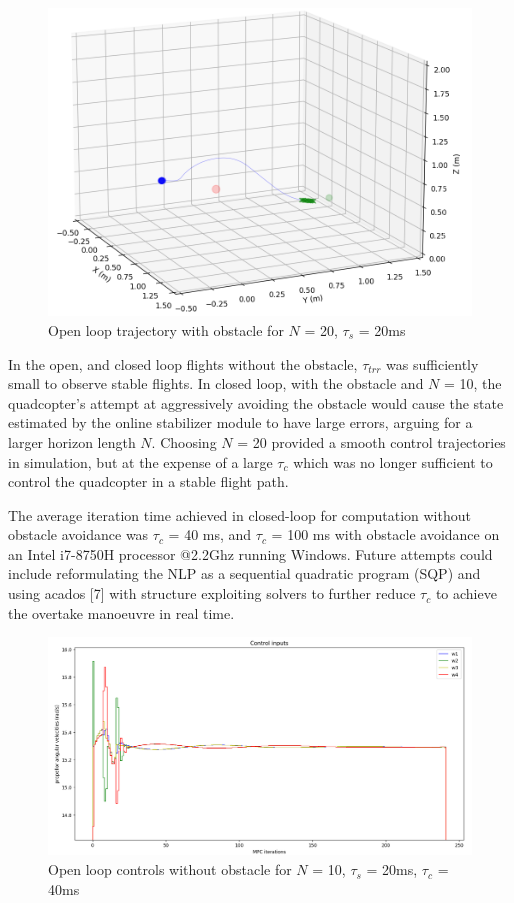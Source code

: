 \documentclass[conference]{IEEEtran}
\begin{document}
\begin{figure}[htbp]
	\centerline{\includegraphics[scale = 0.4]{figures/Screenshot_OLwO_ST.png} }
	\caption{Open loop trajectory with obstacle for $N$ = 20, $\tau_s$ = 20ms}
	\label{Fig4}
\end{figure} 


In the open, and closed loop flights without the obstacle, $\tau_{trr}$ was sufficiently small to observe stable flights. In closed loop, with the obstacle and $N$ = 10, the quadcopter's attempt at aggressively avoiding the obstacle  would cause the state estimated by the online stabilizer module to have large errors, arguing for a larger horizon length $N$. Choosing $N$ = 20 provided a smooth control trajectories in simulation, but at the expense of a large $\tau_{c}$ which was no longer sufficient to control the quadcopter in a stable flight path. 

The average iteration time achieved in closed-loop for computation without obstacle avoidance was $\tau_{c}$ = 40 ms, and $\tau_{c}$ = 100 ms with obstacle avoidance on an Intel i7-8750H processor @2.2Ghz running Windows. Future attempts could include reformulating the NLP as a sequential quadratic program (SQP) and using acados [7] with structure exploiting solvers to further reduce $\tau_c$ to achieve the overtake manoeuvre in real time.

\begin{figure}[htbp]
	\centerline{\includegraphics[scale = 0.45]{figures/Screenshot_OL_U.png} }
	\caption{Open loop controls without obstacle for $N$ = 10, $\tau_s$ = 20ms, $\tau_c$ = 40ms}
	\label{Fig5}
\end{figure}
\end{document}
